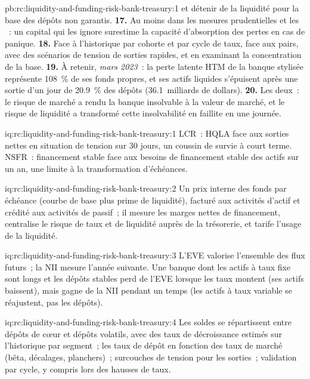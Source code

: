 \begin{solution}{pb:rc:liquidity-and-funding-risk-bank-treasury:1}
et détenir de la liquidité pour la base des dépôts non garantis.
\textbf{17.} Au moins dans les mesures prudentielles et les ~: un capital qui les ignore surestime
la capacité d'absorption des pertes en cas de panique.
\textbf{18.} Face à l'historique par cohorte et par cycle de taux, face aux pairs, avec des scénarios de tension de
sorties rapides, et en examinant la concentration de la base.
\textbf{19.} À retenir, \emph{mars 2023}~: la perte latente HTM de la banque stylisée représente 108~\% de ses
fonds propres, et ses actifs liquides s'épuisent après une sortie d'un jour de 20.9~\% des dépôts (36.1~milliards de dollars).
\textbf{20.} Les deux~: le risque de marché a rendu la banque insolvable à la valeur de marché, et le risque de liquidité
a transformé cette insolvabilité en faillite en une journée.
\end{solution}

\begin{solution}{iq:rc:liquidity-and-funding-risk-bank-treasury:1}
LCR~: HQLA face aux sorties nettes en situation de tension sur 30 jours, un coussin de survie à court terme. NSFR~: financement stable
face aux besoins de financement stable des actifs sur un an, une limite à la transformation d'échéances.
\end{solution}

\begin{solution}{iq:rc:liquidity-and-funding-risk-bank-treasury:2}
Un prix interne des fonds par échéance (courbe de base plus prime de liquidité), facturé aux activités d'actif
et crédité aux activités de passif~; il mesure les marges nettes de financement, centralise le risque de taux et
de liquidité auprès de la trésorerie, et tarife l'usage de la liquidité.
\end{solution}

\begin{solution}{iq:rc:liquidity-and-funding-risk-bank-treasury:3}
L'EVE valorise l'ensemble des flux futurs~; la NII mesure l'année suivante. Une banque dont les actifs à taux fixe sont longs et les
dépôts stables perd de l'EVE lorsque les taux montent (ses actifs baissent), mais gagne de la NII pendant un temps (les actifs à taux variable
se réajustent, pas les dépôts).
\end{solution}

\begin{solution}{iq:rc:liquidity-and-funding-risk-bank-treasury:4}
Les soldes se répartissent entre dépôts de cœur et dépôts volatils, avec des taux de décroissance estimés sur l'historique par segment~; les taux de
dépôt en fonction des taux de marché (bêta, décalages, planchers)~; surcouches de tension pour les sorties~; validation par
cycle, y compris lors des hausses de taux.
\end{solution}

